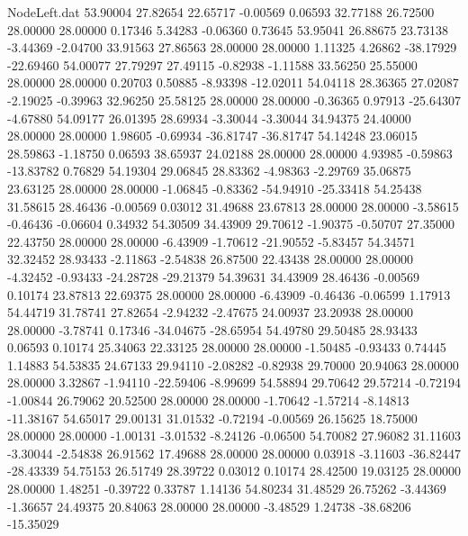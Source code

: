 \begin{filecontents}{NodeLeft.dat}
  53.90004   27.82654   22.65717    -0.00569    0.06593   32.77188   26.72500   28.00000   28.00000    0.17346    5.34283   -0.06360    0.73645
  53.95041   26.88675   23.73138    -3.44369   -2.04700   33.91563   27.86563   28.00000   28.00000    1.11325    4.26862  -38.17929  -22.69460
  54.00077   27.79297   27.49115    -0.82938   -1.11588   33.56250   25.55000   28.00000   28.00000    0.20703    0.50885   -8.93398  -12.02011
  54.04118   28.36365   27.02087    -2.19025   -0.39963   32.96250   25.58125   28.00000   28.00000   -0.36365    0.97913  -25.64307   -4.67880
  54.09177   26.01395   28.69934    -3.30044   -3.30044   34.94375   24.40000   28.00000   28.00000    1.98605   -0.69934  -36.81747  -36.81747
  54.14248   23.06015   28.59863    -1.18750    0.06593   38.65937   24.02188   28.00000   28.00000    4.93985   -0.59863  -13.83782    0.76829
  54.19304   29.06845   28.83362    -4.98363   -2.29769   35.06875   23.63125   28.00000   28.00000   -1.06845   -0.83362  -54.94910  -25.33418
  54.25438   31.58615   28.46436    -0.00569    0.03012   31.49688   23.67813   28.00000   28.00000   -3.58615   -0.46436   -0.06604    0.34932
  54.30509   34.43909   29.70612    -1.90375   -0.50707   27.35000   22.43750   28.00000   28.00000   -6.43909   -1.70612  -21.90552   -5.83457
  54.34571   32.32452   28.93433    -2.11863   -2.54838   26.87500   22.43438   28.00000   28.00000   -4.32452   -0.93433  -24.28728  -29.21379
  54.39631   34.43909   28.46436    -0.00569    0.10174   23.87813   22.69375   28.00000   28.00000   -6.43909   -0.46436   -0.06599    1.17913
  54.44719   31.78741   27.82654    -2.94232   -2.47675   24.00937   23.20938   28.00000   28.00000   -3.78741    0.17346  -34.04675  -28.65954
  54.49780   29.50485   28.93433     0.06593    0.10174   25.34063   22.33125   28.00000   28.00000   -1.50485   -0.93433    0.74445    1.14883
  54.53835   24.67133   29.94110    -2.08282   -0.82938   29.70000   20.94063   28.00000   28.00000    3.32867   -1.94110  -22.59406   -8.99699
  54.58894   29.70642   29.57214    -0.72194   -1.00844   26.79062   20.52500   28.00000   28.00000   -1.70642   -1.57214   -8.14813  -11.38167
  54.65017   29.00131   31.01532    -0.72194   -0.00569   26.15625   18.75000   28.00000   28.00000   -1.00131   -3.01532   -8.24126   -0.06500
  54.70082   27.96082   31.11603    -3.30044   -2.54838   26.91562   17.49688   28.00000   28.00000    0.03918   -3.11603  -36.82447  -28.43339
  54.75153   26.51749   28.39722     0.03012    0.10174   28.42500   19.03125   28.00000   28.00000    1.48251   -0.39722    0.33787    1.14136
  54.80234   31.48529   26.75262    -3.44369   -1.36657   24.49375   20.84063   28.00000   28.00000   -3.48529    1.24738  -38.68206  -15.35029

\end{filecontents}

